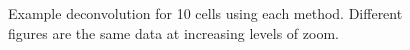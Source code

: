 \documentclass[a4paper]{article}
\begin{document}
\begin{figure}[h!]
\centering
{}
\caption{\label{fig:raw1}Example deconvolution for 10 cells using each method. Different figures are the same data at increasing levels of zoom.}
\end{figure}
\end{document}
